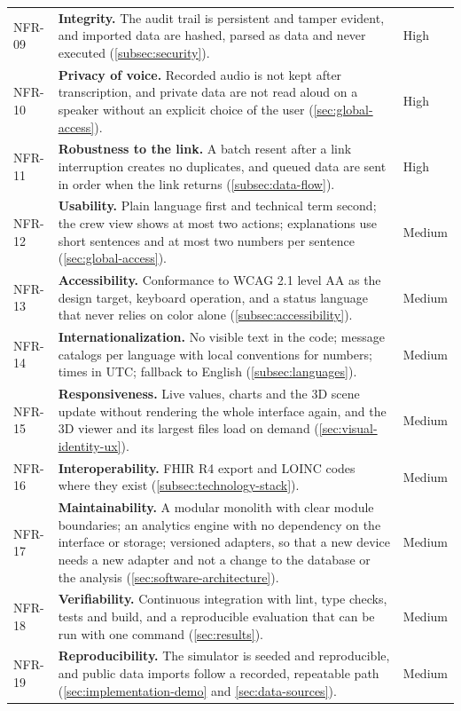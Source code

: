 {\begin{longtable}{p{1.5cm}p{10.8cm}p{1.5cm}}
NFR-09 & \textbf{Integrity.} The audit trail is persistent and tamper evident, and imported data are hashed, parsed as data and never executed (\ref{subsec:security}). & High \\
NFR-10 & \textbf{Privacy of voice.} Recorded audio is not kept after transcription, and private data are not read aloud on a speaker without an explicit choice of the user (\ref{sec:global-access}). & High \\
NFR-11 & \textbf{Robustness to the link.} A batch resent after a link interruption creates no duplicates, and queued data are sent in order when the link returns (\ref{subsec:data-flow}). & High \\
NFR-12 & \textbf{Usability.} Plain language first and technical term second; the crew view shows at most two actions; explanations use short sentences and at most two numbers per sentence (\ref{sec:global-access}). & Medium \\
NFR-13 & \textbf{Accessibility.} Conformance to WCAG 2.1 level AA as the design target, keyboard operation, and a status language that never relies on color alone (\ref{subsec:accessibility}). & Medium \\
NFR-14 & \textbf{Internationalization.} No visible text in the code; message catalogs per language with local conventions for numbers; times in UTC; fallback to English (\ref{subsec:languages}). & Medium \\
NFR-15 & \textbf{Responsiveness.} Live values, charts and the 3D scene update without rendering the whole interface again, and the 3D viewer and its largest files load on demand (\ref{sec:visual-identity-ux}). & Medium \\
NFR-16 & \textbf{Interoperability.} FHIR R4 export and LOINC codes where they exist (\ref{subsec:technology-stack}). & Medium \\
NFR-17 & \textbf{Maintainability.} A modular monolith with clear module boundaries; an analytics engine with no dependency on the interface or storage; versioned adapters, so that a new device needs a new adapter and not a change to the database or the analysis (\ref{sec:software-architecture}). & Medium \\
NFR-18 & \textbf{Verifiability.} Continuous integration with lint, type checks, tests and build, and a reproducible evaluation that can be run with one command (\ref{sec:results}). & Medium \\
NFR-19 & \textbf{Reproducibility.} The simulator is seeded and reproducible, and public data imports follow a recorded, repeatable path (\ref{sec:implementation-demo} and \ref{sec:data-sources}). & Medium \\

\end{longtable}}
